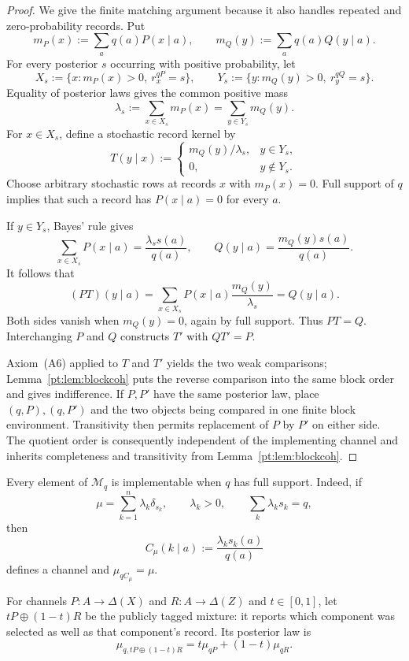 \begin{proof}
We give the finite matching argument because it also handles repeated and
zero-probability records.  Put
\[
 m_P(x):=\sum_aq(a)P(x\mid a),
 \qquad
 m_Q(y):=\sum_aq(a)Q(y\mid a).
\]
For every posterior $s$ occurring with positive probability, let
\[
 X_s:=\{x:m_P(x)>0,\ r_x^{qP}=s\},
 \qquad
 Y_s:=\{y:m_Q(y)>0,\ r_y^{qQ}=s\}.
\]
Equality of posterior laws gives the common positive mass
\[
 \lambda_s:=\sum_{x\in X_s}m_P(x)
            =\sum_{y\in Y_s}m_Q(y).
\]
For $x\in X_s$, define a stochastic record kernel by
\[
 T(y\mid x):=
 \begin{cases}
   m_Q(y)/\lambda_s,&y\in Y_s,\\
   0,&y\notin Y_s.
 \end{cases}
\]
Choose arbitrary stochastic rows at records $x$ with $m_P(x)=0$.  Full support
of $q$ implies that such a record has $P(x\mid a)=0$ for every $a$.

If $y\in Y_s$, Bayes' rule gives
\[
 \sum_{x\in X_s}P(x\mid a)
 =\frac{\lambda_s s(a)}{q(a)},
 \qquad
 Q(y\mid a)=\frac{m_Q(y)s(a)}{q(a)}.
\]
It follows that
\[
 (PT)(y\mid a)
 =\sum_{x\in X_s}P(x\mid a)\frac{m_Q(y)}{\lambda_s}
 =Q(y\mid a).
\]
Both sides vanish when $m_Q(y)=0$, again by full support.  Thus $PT=Q$.
Interchanging $P$ and $Q$ constructs $T'$ with $QT'=P$.

Axiom~\textup{(A6)} applied to $T$ and $T'$ yields the two weak comparisons;
Lemma~\ref{pt:lem:blockcoh} puts the reverse comparison into the same block
order and gives indifference.  If $P,P'$ have the same posterior law, place
$(q,P),(q,P')$ and the two objects being compared in one finite block
environment.  Transitivity then permits replacement of $P$ by $P'$ on either
side.  The quotient order is consequently independent of the implementing
channel and inherits completeness and transitivity from
Lemma~\ref{pt:lem:blockcoh}.
\end{proof}

Every element of $\mathcal M_q$ is implementable when $q$ has full support.
Indeed, if
\[
 \mu=\sum_{k=1}^n\lambda_k\delta_{s_k},
 \qquad \lambda_k>0,
 \qquad \sum_k\lambda_ks_k=q,
\]
then
\begin{equation}
 C_\mu(k\mid a):=\frac{\lambda_ks_k(a)}{q(a)}
 \label{pt:eq:canonical-implementation}
\end{equation}
defines a channel and $\mu_{qC_\mu}=\mu$.

For channels $P:A\to\Delta(X)$ and $R:A\to\Delta(Z)$ and
$t\in[0,1]$, let $tP\oplus(1-t)R$ be the publicly tagged mixture: it
reports which component was selected as well as that component's record.  Its
posterior law is
\begin{equation}
 \mu_{q,tP\oplus(1-t)R}
 =t\mu_{qP}+(1-t)\mu_{qR}.
 \label{pt:eq:public-posterior-mixture}
\end{equation}

